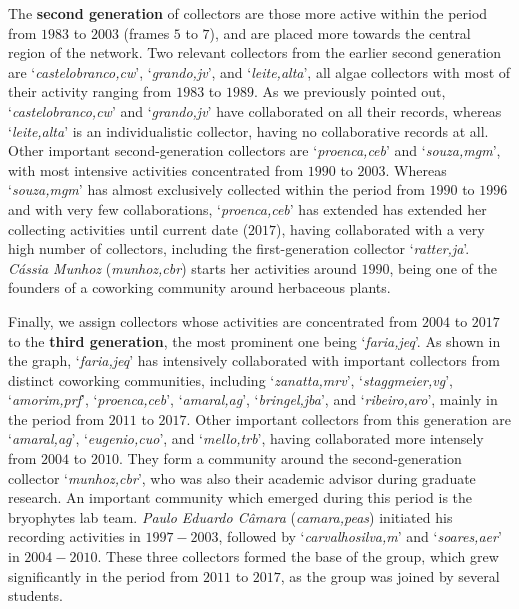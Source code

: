 The \textbf{second generation} of collectors are those more active within the period from $1983$ to $2003$ (frames $5$ to $7$), and are placed more towards the central region of the network.
%
Two relevant collectors from the earlier second generation are `\textit{castelobranco,cw}', `\textit{grando,jv}', and `\textit{leite,alta}', all algae collectors with most of their activity ranging from $1983$ to $1989$.
As we previously pointed out, `\textit{castelobranco,cw}' and `\textit{grando,jv}' have collaborated on all their records, whereas `\textit{leite,alta}' is an individualistic collector, having no collaborative records at all. Other important second-generation collectors are `\textit{proenca,ceb}' and `\textit{souza,mgm}', with most intensive activities concentrated from $1990$ to $2003$.
Whereas `\textit{souza,mgm}' has almost exclusively collected within the period from $1990$ to $1996$ and with very few collaborations, `\textit{proenca,ceb}' has extended has extended her collecting activities until current date ($2017$), having collaborated with a very high number of collectors, including the first-generation collector `\textit{ratter,ja}'.
\textit{Cássia Munhoz} (\textit{munhoz,cbr}) starts her activities around $1990$, being one of the founders of a coworking community around herbaceous plants.

Finally, we assign collectors whose activities are concentrated from $2004$ to $2017$ to the \textbf{third generation}, the most prominent one being `\textit{faria,jeq}'.
As shown in the graph, `\textit{faria,jeq}' has intensively collaborated with important collectors from distinct coworking communities, including `\textit{zanatta,mrv}', `\textit{staggmeier,vg}', `\textit{amorim,prf}', `\textit{proenca,ceb}', `\textit{amaral,ag}', `\textit{bringel,jba}', and `\textit{ribeiro,aro}', mainly in the period from $2011$ to $2017$.
%
Other important collectors from this generation are `\textit{amaral,ag}', `\textit{eugenio,cuo}', and `\textit{mello,trb}', having collaborated more intensely from $2004$ to $2010$. They form a community around the second-generation collector `\textit{munhoz,cbr}', who was also their academic advisor during graduate research.
%
An important community which emerged during this period is the bryophytes lab team. 
\textit{Paulo Eduardo Câmara} (\textit{camara,peas}) initiated his recording activities in $1997-2003$, followed by `\textit{carvalhosilva,m}' and `\textit{soares,aer}' in $2004-2010$. These three collectors formed the base of the group, which grew significantly in the period from $2011$ to $2017$, as the group was joined by several students. 



